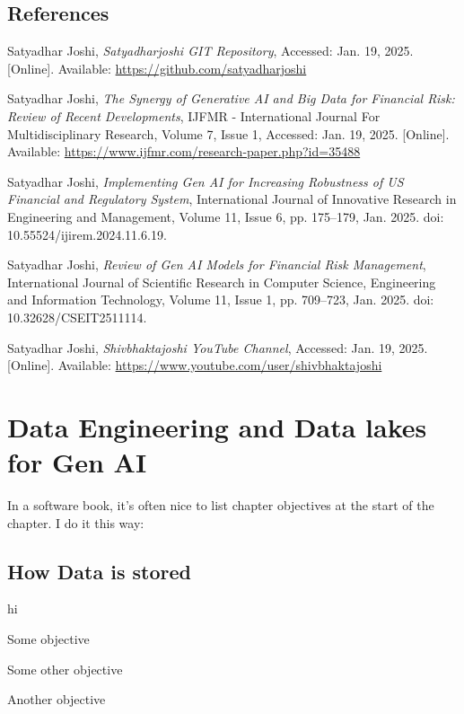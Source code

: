 \documentclass[a4paper,headinclude=on,footinclude=on,12pt,oneside]{scrbook}
\begin{document}
\section*{References}
\begin{thebibliography}{9}

	
	Satyadhar Joshi, 
	\textit{Satyadharjoshi GIT Repository}, 
	Accessed: Jan. 19, 2025. [Online]. Available: \url{https://github.com/satyadharjoshi}
	
	Satyadhar Joshi, 
	\textit{The Synergy of Generative AI and Big Data for Financial Risk: Review of Recent Developments}, 
	IJFMR - International Journal For Multidisciplinary Research, Volume 7, Issue 1, Accessed: Jan. 19, 2025. [Online]. Available: \url{https://www.ijfmr.com/research-paper.php?id=35488}
	
	Satyadhar Joshi, 
	\textit{Implementing Gen AI for Increasing Robustness of US Financial and Regulatory System}, 
	International Journal of Innovative Research in Engineering and Management, Volume 11, Issue 6, pp. 175–179, Jan. 2025. doi: 10.55524/ijirem.2024.11.6.19.
	
	Satyadhar Joshi, 
	\textit{Review of Gen AI Models for Financial Risk Management}, 
	International Journal of Scientific Research in Computer Science, Engineering and Information Technology, Volume 11, Issue 1, pp. 709–723, Jan. 2025. doi: 10.32628/CSEIT2511114.
	
	Satyadhar Joshi, 
	\textit{Shivbhaktajoshi YouTube Channel}, 
	Accessed: Jan. 19, 2025. [Online]. Available: \url{https://www.youtube.com/user/shivbhaktajoshi}
	
\end{thebibliography}





\chapter{Data Engineering and Data lakes for Gen AI  }
In a software book, it's often nice to list chapter objectives at the start of the chapter. I do it this way:
\section{How Data is stored}
hi
\begin{arrows}
	\item Some objective
	\item Some other objective
	\item Another objective
\end{arrows}
\end{document}
